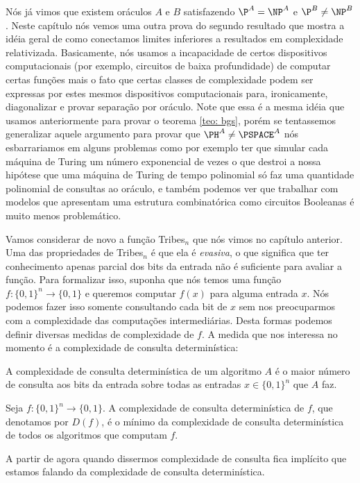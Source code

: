 Nós já vimos que existem oráculos $A$ e $B$ satisfazendo $\P^{A} = \NP^{A}$ e $\P^{B} \neq \NP^{B}$. Neste capítulo nós vemos uma outra prova do segundo resultado que mostra a idéia geral de como conectamos limites inferiores a resultados em complexidade relativizada. Basicamente, nós usamos a incapacidade de certos dispositivos computacionais (por exemplo, circuitos de baixa profundidade) de computar certas funções mais o fato que certas classes de complexidade podem ser expressas por estes mesmos dispositivos computacionais para, ironicamente, diagonalizar e provar separação por oráculo. Note que essa é a mesma idéia que usamos anteriormente para provar o teorema \ref{teo: bgs}, porém se tentassemos generalizar aquele argumento para provar que $\PH^{A} \neq \PSPACE^{A}$ nós esbarrariamos em alguns problemas como por exemplo ter que simular cada máquina de Turing um número exponencial de vezes o que destroi a nossa hipótese que uma máquina de Turing de tempo polinomial só faz uma quantidade polinomial de consultas ao oráculo, e também podemos ver que trabalhar com modelos que apresentam uma estrutura combinatórica como circuitos Booleanas é muito menos problemático.

Vamos considerar de novo a função Tribes$_{n}$ que nós vimos no capítulo anterior. Uma das propriedades de Tribes$_{n}$ é que ela é \emph{evasiva}, o que significa que ter conhecimento apenas parcial dos bits da entrada não é suficiente para avaliar a função. Para formalizar isso, suponha que nós temos uma função $f: \{0, 1\}^{n} \to \{0, 1\}$ e queremos computar $f(x)$ para alguma entrada $x$. Nós podemos fazer isso somente consultando cada bit de $x$ sem nos preocuparmos com a complexidade das computações intermediárias. Desta formas podemos definir diversas medidas de complexidade de $f$. A medida que nos interessa no momento é a complexidade de consulta determinística:

\begin{defi}

A complexidade de consulta determinística de um algoritmo $A$ é o maior número de consulta aos bits da entrada sobre todas as entradas $x \in \{0, 1\}^{n}$ que $A$ faz.

Seja $f: \{0, 1\}^{n} \to \{0, 1\}$. A complexidade de consulta determinística de $f$, que denotamos por $D(f)$, é o mínimo da complexidade de consulta determinística de todos os algoritmos que computam $f$.

\end{defi}

A partir de agora quando dissermos complexidade de consulta fica implícito que estamos falando da complexidade de consulta determinística.

